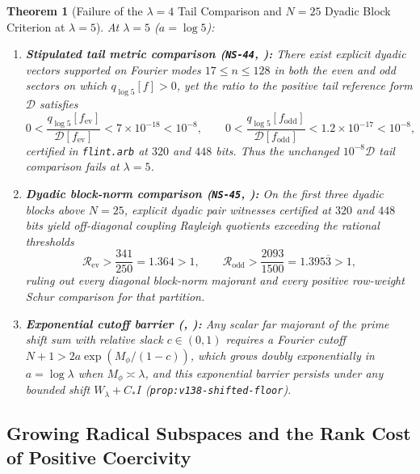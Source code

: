 \documentclass[11pt]{article}
\newtheorem{theorem}{Theorem}[section]
\theoremstyle{remark}
\begin{document}
\begin{theorem}[Failure of the $\lambda = 4$ Tail Comparison and $N = 25$ Dyadic Block Criterion at $\lambda = 5$]
\label{thm:lambda5-failures}
At $\lambda = 5$ ($a = \log 5$):
\begin{enumerate}[label=(\alph*)]
  \item \textbf{Stipulated tail metric comparison (\texttt{NS-44}, ):} There exist explicit dyadic vectors supported on Fourier modes $17 \le n \le 128$ in both the even and odd sectors on which $q_{\log 5}[f] > 0$, yet the ratio to the positive tail reference form $\mathcal{D}$ satisfies
  \begin{equation}
    0 < \frac{q_{\log 5}[f_{\mathrm{ev}}]}{\mathcal{D}[f_{\mathrm{ev}}]} < 7 \times 10^{-18} < 10^{-8}, \qquad
    0 < \frac{q_{\log 5}[f_{\mathrm{odd}}]}{\mathcal{D}[f_{\mathrm{odd}}]} < 1.2 \times 10^{-17} < 10^{-8},
  \end{equation}
  certified in \texttt{flint.arb} at $320$ and $448$ bits. Thus the unchanged $10^{-8}\mathcal{D}$ tail comparison fails at $\lambda = 5$.
  \item \textbf{Dyadic block-norm comparison (\texttt{NS-45}, ):} On the first three dyadic blocks above $N = 25$, explicit dyadic pair witnesses certified at $320$ and $448$ bits yield off-diagonal coupling Rayleigh quotients exceeding the rational thresholds
  \begin{equation}
    \mathcal{R}_{\mathrm{ev}} > \frac{341}{250} = 1.364 > 1, \qquad
    \mathcal{R}_{\mathrm{odd}} > \frac{2093}{1500} = 1.395\overline{3} > 1,
  \end{equation}
  ruling out every diagonal block-norm majorant and every positive row-weight Schur comparison for that partition.
  \item \textbf{Exponential cutoff barrier (, ):} Any scalar far majorant of the prime shift sum with relative slack $c \in (0,1)$ requires a Fourier cutoff $N + 1 > 2a\exp(M_\phi/(1-c))$, which grows doubly exponentially in $a = \log\lambda$ when $M_\phi \asymp \lambda$, and this exponential barrier persists under any bounded shift $W_\lambda + C_* I$ (\texttt{prop:v138-shifted-floor}).
\end{enumerate}
\end{theorem}

\subsection{Growing Radical Subspaces and the Rank Cost of Positive Coercivity}
\end{document}
